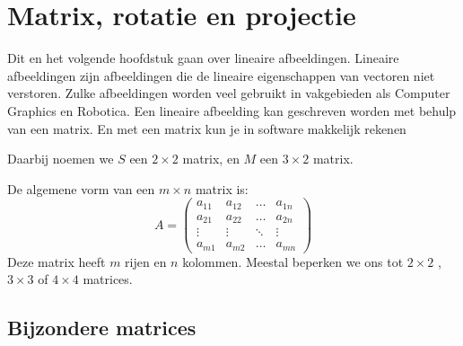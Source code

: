 \chapter{Matrix, rotatie en projectie}
\label{chap: matrix, rotatie en projectie}

Dit en het volgende hoofdstuk gaan over lineaire afbeeldingen. Lineaire afbeeldingen zijn afbeeldingen die de lineaire eigenschappen van  vectoren niet verstoren. Zulke afbeeldingen worden veel gebruikt in vakgebieden als Computer Graphics en Robotica. Een lineaire afbeelding kan geschreven worden met behulp van een matrix. En met een matrix kun je in software makkelijk rekenen


Daarbij noemen we $S$ een $2 \times 2$ matrix, en $M$ een $3 \times 2$ matrix. 

De algemene vorm van een $m \times n$ matrix is:
\[
    A = \begin{pmatrix}
        a_{11}  &  a_{12} & \ldots & a_{1n} \\
        a_{21}  &  a_{22} & \ldots & a_{2n} \\
        \vdots  & \vdots  & \ddots & \vdots \\
        a_{m1}  & a_{m2}  & \ldots & a_{mn}
    \end{pmatrix}
\]
Deze matrix heeft $ m $ rijen en $ n $ kolommen. Meestal beperken we ons tot $ 2 \times 2 $ , \  $ 3 \times 3 $ of $ 4 \times 4 $ matrices.
\section{Bijzondere matrices}
 



